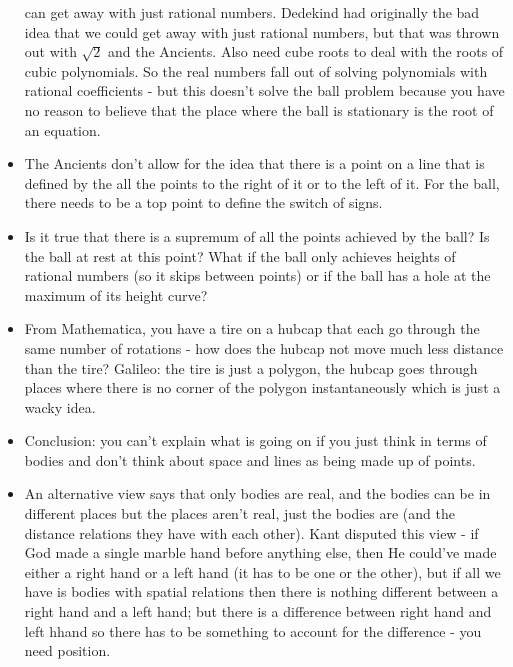 \documentclass[12pt]{article}
\theoremstyle{definition}
\begin{document}
\begin{itemize}
        can get away with just rational numbers. Dedekind had originally the
        bad idea that we could get away with just rational numbers, but that
        was thrown out with $\sqrt{2}$ and the Ancients. Also need cube roots
        to deal with the roots of cubic polynomials. So the real numbers fall
        out of solving polynomials with rational coefficients - but this
        doesn't solve the ball problem because you have no reason to believe
        that the place where the ball is stationary is the root of an equation.
    \item 
        The Ancients don't allow for the idea that there is a point on a line
        that is defined by the all the points to the right of it or to the left
        of it. For the ball, there needs to be a top point to define the switch
        of signs.
    \item
        Is it true that there is a supremum of all the points achieved by the
        ball? Is the ball at rest at this point? What if the ball only achieves
        heights of rational numbers (so it skips between points) or if the ball
        has a hole at the maximum of its height curve?
    \item
        From Mathematica, you have a tire on a hubcap that each go through the
        same number of rotations - how does the hubcap not move much less
        distance than the tire? Galileo: the tire is just a polygon, the hubcap
        goes through places where there is no corner of the polygon
        instantaneously which is just a wacky idea.
    \item 
        Conclusion: you can't explain what is going on if you just think in
        terms of bodies and don't think about space and lines as being made up
        of points.
    \item
        An alternative view says that only bodies are real, and the bodies can
        be in different places but the places aren't real, just the bodies are
        (and the distance relations they have with each other). Kant disputed
        this view - if God made a single marble hand before anything else, then
        He could've made either a right hand or a left hand (it has to be one
        or the other), but if all we have is bodies with spatial relations then
        there is nothing different between a right hand and a left hand; but
        there is a difference between right hand and left hhand so there has to
        be something to account for the difference - you need position.
\end{itemize}
\end{document}
